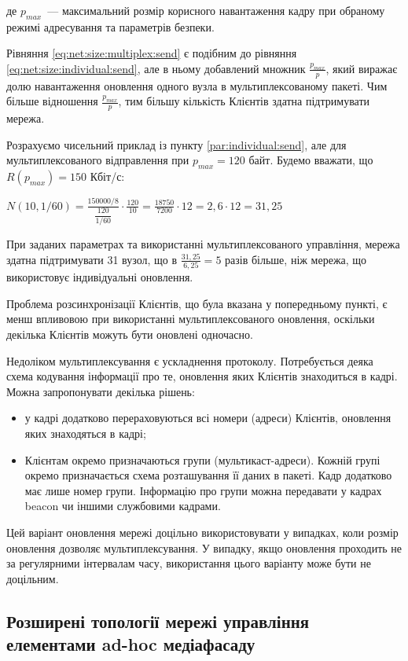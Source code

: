 \documentclass[a4paper,ukrainian,utf8,nocolumnsxix,nocolumnxxxii,nocolumnxxxi,floatsection,equationsection]{eskdtext}
\begin{document}
де $p_{max}$~--- максимальний розмір корисного навантаження кадру при обраному режимі адресування та параметрів безпеки.

Рівняння \ref{eq:net:size:multiplex:send} є подібним до рівняння \ref{eq:net:size:individual:send}, але в ньому добавлений множник $\frac{p_{max}}{p}$, який виражає долю навантаження оновлення одного вузла в мультиплексованому пакеті. Чим більше відношення $\frac{p_{max}}{p}$, тим більшу кількість Клієнтів здатна підтримувати мережа.

Розрахуємо чисельний приклад із пункту \ref{par:individual:send}, але для мультиплексованого відправлення при $p_{max} = 120$ байт. Будемо вважати, що $R(p_{max}) = 150$ Кбіт/с:

$N(10, 1/60) = \frac{150000 / 8}{\dfrac{120}{1/60}} \cdot \frac{120}{10} = 
		\frac{18750}{7200} \cdot 12 = 2,6 \cdot 12 = 31,25$


При заданих параметрах та використанні мультиплексованого управління, мережа здатна підтримувати 31 вузол, що в $\frac{31,25}{6,25} = 5$ разів більше, ніж мережа, що використовує індивідуальні оновлення. 

Проблема розсинхронізації Клієнтів, що була вказана у попередньому пункті, є менш впливовою при використанні мультиплексованого оновлення, оскільки декілька Клієнтів можуть бути оновлені одночасно.

Недоліком мультиплексування є ускладнення протоколу. Потребується деяка схема кодування інформації про те, оновлення яких Клієнтів знаходиться в кадрі. Можна запропонувати декілька рішень:

\begin{itemize}
	\item у кадрі додатково перераховуються всі номери (адреси) Клієнтів, оновлення яких знаходяться в кадрі;
	\item Клієнтам окремо призначаються групи (мультикаст-адреси). Кожній групі окремо призначається схема розташування її даних в пакеті. Кадр додатково має лише номер групи. Інформацію про групи можна передавати у кадрах beacon чи іншими службовими кадрами.
\end{itemize}

Цей варіант оновлення мережі доцільно використовувати у випадках, коли розмір оновлення дозволяє мультиплексування. У випадку, якщо оновлення проходить не за регулярними інтервалам часу, використання цього варіанту може бути не доцільним.

\subsection{Розширені топології мережі управління елементами ad-hoc медіафасаду}
\end{document}
